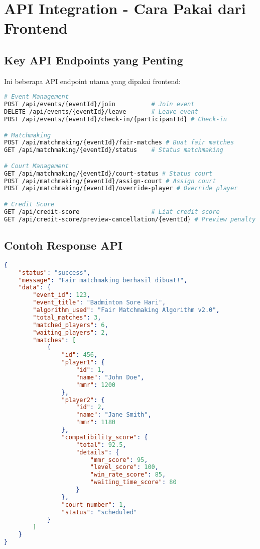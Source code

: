 \documentclass[12pt]{article}
\begin{document}
\section{API Integration - Cara Pakai dari Frontend}

\subsection{Key API Endpoints yang Penting}

Ini beberapa API endpoint utama yang dipakai frontend:

\begin{lstlisting}[language=bash, caption=API Endpoints Utama]
# Event Management
POST /api/events/{eventId}/join          # Join event
DELETE /api/events/{eventId}/leave       # Leave event
POST /api/events/{eventId}/check-in/{participantId} # Check-in

# Matchmaking
POST /api/matchmaking/{eventId}/fair-matches # Buat fair matches
GET /api/matchmaking/{eventId}/status    # Status matchmaking

# Court Management
GET /api/matchmaking/{eventId}/court-status # Status court
POST /api/matchmaking/{eventId}/assign-court # Assign court
POST /api/matchmaking/{eventId}/override-player # Override player

# Credit Score
GET /api/credit-score                    # Liat credit score
GET /api/credit-score/preview-cancellation/{eventId} # Preview penalty
\end{lstlisting}

\subsection{Contoh Response API}

\begin{lstlisting}[language=JSON, caption=Response Fair Matchmaking API]
{
    "status": "success",
    "message": "Fair matchmaking berhasil dibuat!",
    "data": {
        "event_id": 123,
        "event_title": "Badminton Sore Hari",
        "algorithm_used": "Fair Matchmaking Algorithm v2.0",
        "total_matches": 3,
        "matched_players": 6,
        "waiting_players": 2,
        "matches": [
            {
                "id": 456,
                "player1": {
                    "id": 1,
                    "name": "John Doe",
                    "mmr": 1200
                },
                "player2": {
                    "id": 2,
                    "name": "Jane Smith", 
                    "mmr": 1180
                },
                "compatibility_score": {
                    "total": 92.5,
                    "details": {
                        "mmr_score": 95,
                        "level_score": 100,
                        "win_rate_score": 85,
                        "waiting_time_score": 80
                    }
                },
                "court_number": 1,
                "status": "scheduled"
            }
        ]
    }
}
\end{lstlisting}
\end{document}
